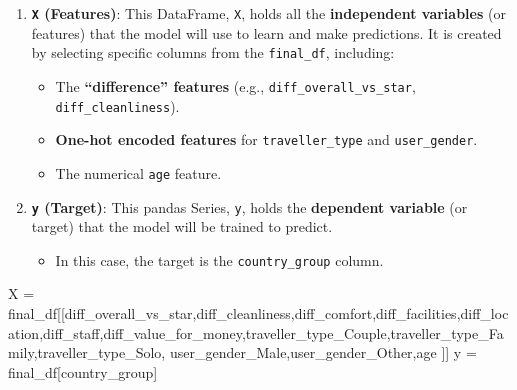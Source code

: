 \documentclass[
  letterpaper,
  DIV=11,
  numbers=noendperiod]{scrartcl}
\newenvironment{Shaded}{\begin{snugshade}}{\end{snugshade}}
\newcommand{\NormalTok}[1]{\textcolor[rgb]{0.00,0.23,0.31}{#1}}
\newcommand{\OperatorTok}[1]{\textcolor[rgb]{0.37,0.37,0.37}{#1}}
\newcommand{\StringTok}[1]{\textcolor[rgb]{0.13,0.47,0.30}{#1}}
\providecommand{\tightlist}{%
  \setlength{\itemsep}{0pt}\setlength{\parskip}{0pt}}
\begin{document}
\begin{enumerate}
\def\labelenumi{\arabic{enumi}.}
\tightlist
\item
  \textbf{\texttt{X} (Features)}: This DataFrame, \texttt{X}, holds all
  the \textbf{independent variables} (or features) that the model will
  use to learn and make predictions. It is created by selecting specific
  columns from the \texttt{final\_df}, including:

  \begin{itemize}
  \tightlist
  \item
    The \textbf{``difference'' features} (e.g.,
    \texttt{diff\_overall\_vs\_star}, \texttt{diff\_cleanliness}).
  \item
    \textbf{One-hot encoded features} for \texttt{traveller\_type} and
    \texttt{user\_gender}.
  \item
    The numerical \texttt{age} feature.
  \end{itemize}
\item
  \textbf{\texttt{y} (Target)}: This pandas Series, \texttt{y}, holds
  the \textbf{dependent variable} (or target) that the model will be
  trained to predict.

  \begin{itemize}
  \tightlist
  \item
    In this case, the target is the \texttt{country\_group} column.
  \end{itemize}
\end{enumerate}

\begin{Shaded}
\begin{Highlighting}[]
\NormalTok{X }\OperatorTok{=}\NormalTok{ final\_df[[}\StringTok{\textquotesingle{}diff\_overall\_vs\_star\textquotesingle{}}\NormalTok{,}\StringTok{\textquotesingle{}diff\_cleanliness\textquotesingle{}}\NormalTok{,}\StringTok{\textquotesingle{}diff\_comfort\textquotesingle{}}\NormalTok{,}\StringTok{\textquotesingle{}diff\_facilities\textquotesingle{}}\NormalTok{,}\StringTok{\textquotesingle{}diff\_location\textquotesingle{}}\NormalTok{,}\StringTok{\textquotesingle{}diff\_staff\textquotesingle{}}\NormalTok{,}\StringTok{\textquotesingle{}diff\_value\_for\_money\textquotesingle{}}\NormalTok{,}\StringTok{\textquotesingle{}traveller\_type\_Couple\textquotesingle{}}\NormalTok{,}\StringTok{\textquotesingle{}traveller\_type\_Family\textquotesingle{}}\NormalTok{,}\StringTok{\textquotesingle{}traveller\_type\_Solo\textquotesingle{}}\NormalTok{, }\StringTok{\textquotesingle{}user\_gender\_Male\textquotesingle{}}\NormalTok{,}\StringTok{\textquotesingle{}user\_gender\_Other\textquotesingle{}}\NormalTok{,}\StringTok{\textquotesingle{}age\textquotesingle{}}\NormalTok{ ]] }
\NormalTok{y }\OperatorTok{=}\NormalTok{ final\_df[}\StringTok{\textquotesingle{}country\_group\textquotesingle{}}\NormalTok{]}
\end{Highlighting}
\end{Shaded}
\end{document}

